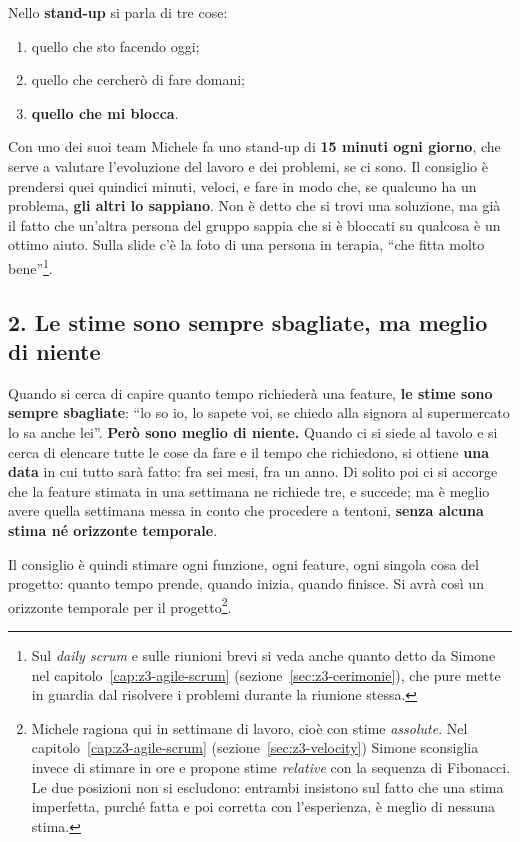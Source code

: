 Nello \textbf{stand-up} si parla di tre cose:
\begin{enumerate}
  \item quello che sto facendo oggi;
  \item quello che cercherò di fare domani;
  \item \textbf{quello che mi blocca}.
\end{enumerate}
Con uno dei suoi team Michele fa uno stand-up di \textbf{15 minuti ogni giorno},
che serve a valutare l'evoluzione del lavoro e dei problemi, se ci sono. Il
consiglio è prendersi quei quindici minuti, veloci, e fare in modo che, se
qualcuno ha un problema, \textbf{gli altri lo sappiano}. Non è detto che si trovi
una soluzione, ma già il fatto che un'altra persona del gruppo sappia che si è
bloccati su qualcosa è un ottimo aiuto. Sulla slide c'è la foto di una persona
in terapia, ``che fitta molto bene''\footnote{Sul \emph{daily scrum} e sulle
riunioni brevi si veda anche quanto detto da Simone nel
capitolo~\ref{cap:z3-agile-scrum} (sezione~\ref{sec:z3-cerimonie}), che pure
mette in guardia dal risolvere i problemi durante la riunione stessa.}.

\subsection{2. Le stime sono sempre sbagliate, ma meglio di niente}

Quando si cerca di capire quanto tempo richiederà una feature, \textbf{le stime
sono sempre sbagliate}: ``lo so io, lo sapete voi, se chiedo alla signora al
supermercato lo sa anche lei''. \textbf{Però sono meglio di niente.} Quando ci si
siede al tavolo e si cerca di elencare tutte le cose da fare e il tempo che
richiedono, si ottiene \textbf{una data} in cui tutto sarà fatto: fra sei mesi,
fra un anno. Di solito poi ci si accorge che la feature stimata in una settimana
ne richiede tre, e succede; ma è meglio avere quella settimana messa in conto
che procedere a tentoni, \textbf{senza alcuna stima né orizzonte temporale}.

Il consiglio è quindi stimare ogni funzione, ogni feature, ogni singola cosa del
progetto: quanto tempo prende, quando inizia, quando finisce. Si avrà così un
orizzonte temporale per il progetto\footnote{Michele ragiona qui in settimane di
lavoro, cioè con stime \emph{assolute}. Nel capitolo~\ref{cap:z3-agile-scrum}
(sezione~\ref{sec:z3-velocity}) Simone sconsiglia invece di stimare in ore e
propone stime \emph{relative} con la sequenza di Fibonacci. Le due posizioni non
si escludono: entrambi insistono sul fatto che una stima imperfetta, purché
fatta e poi corretta con l'esperienza, è meglio di nessuna stima.}.

